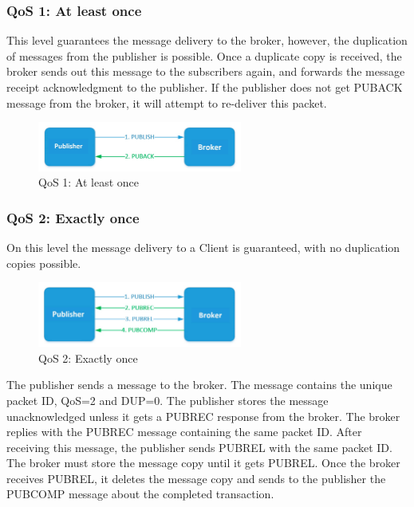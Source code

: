 \documentclass[\main/main.tex]{subfiles}
\begin{document}
\subsubsection{QoS 1: At least once}
This level guarantees the message delivery to the broker, however, the duplication of messages from the publisher is possible. Once a duplicate copy is received, the broker sends out this message to the subscribers again, and forwards the message receipt acknowledgment to the publisher. If the publisher does not get PUBACK message from the broker, it will attempt to re-deliver this packet.

\begin{figure}[H]
    \begin{center}
        \includegraphics[width=0.6\textwidth]{mqtt_qos_1.jpg}
    \end{center}
    \caption{QoS 1: At least once}
    \label{fig:mqtt_qos_1}
\end{figure}

\subsubsection{QoS 2: Exactly once}
On this level the message delivery to a Client is guaranteed, with no duplication copies possible.

\begin{figure}[H]
    \begin{center}
        \includegraphics[width=0.6\textwidth]{mqtt_qos_2.jpg}
    \end{center}
    \caption{QoS 2: Exactly once}
    \label{fig:mqtt_qos_2}
\end{figure}
The publisher sends a message to the broker. The message contains the unique packet ID, QoS=2 and DUP=0. The publisher stores the message unacknowledged unless it gets a PUBREC response from the broker. The broker replies with the PUBREC message containing the same packet ID. After receiving this message, the publisher sends PUBREL with the same packet ID. The broker must store the message copy until it gets PUBREL. Once the broker receives PUBREL, it deletes the message copy and sends to the publisher the PUBCOMP message about the completed transaction.
\end{document}
